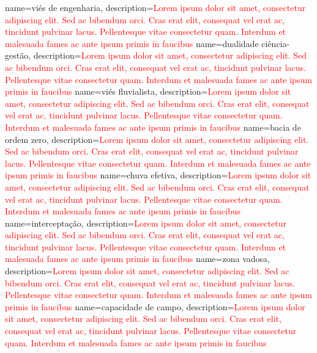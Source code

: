 {
    name=viés de engenharia,
    description={\textcolor{red}{Lorem ipsum dolor sit amet, consectetur adipiscing elit. Sed ac bibendum orci. Cras erat elit, consequat vel erat ac, tincidunt pulvinar lacus. Pellentesque vitae consectetur quam. Interdum et malesuada fames ac ante ipsum primis in faucibus}}
}
{
    name=dualidade ciência-gestão,
    description={\textcolor{red}{Lorem ipsum dolor sit amet, consectetur adipiscing elit. Sed ac bibendum orci. Cras erat elit, consequat vel erat ac, tincidunt pulvinar lacus. Pellentesque vitae consectetur quam. Interdum et malesuada fames ac ante ipsum primis in faucibus}}
}
{
    name=viés fluvialista,
    description={\textcolor{red}{Lorem ipsum dolor sit amet, consectetur adipiscing elit. Sed ac bibendum orci. Cras erat elit, consequat vel erat ac, tincidunt pulvinar lacus. Pellentesque vitae consectetur quam. Interdum et malesuada fames ac ante ipsum primis in faucibus}}
}
{
    name=bacia de ordem zero,
    description={\textcolor{red}{Lorem ipsum dolor sit amet, consectetur adipiscing elit. Sed ac bibendum orci. Cras erat elit, consequat vel erat ac, tincidunt pulvinar lacus. Pellentesque vitae consectetur quam. Interdum et malesuada fames ac ante ipsum primis in faucibus}}
}
{
    name=chuva efetiva,
    description={\textcolor{red}{Lorem ipsum dolor sit amet, consectetur adipiscing elit. Sed ac bibendum orci. Cras erat elit, consequat vel erat ac, tincidunt pulvinar lacus. Pellentesque vitae consectetur quam. Interdum et malesuada fames ac ante ipsum primis in faucibus}}
}
{
    name=interceptação,
    description={\textcolor{red}{Lorem ipsum dolor sit amet, consectetur adipiscing elit. Sed ac bibendum orci. Cras erat elit, consequat vel erat ac, tincidunt pulvinar lacus. Pellentesque vitae consectetur quam. Interdum et malesuada fames ac ante ipsum primis in faucibus}}
}
{
    name=zona vadosa,
    description={\textcolor{red}{Lorem ipsum dolor sit amet, consectetur adipiscing elit. Sed ac bibendum orci. Cras erat elit, consequat vel erat ac, tincidunt pulvinar lacus. Pellentesque vitae consectetur quam. Interdum et malesuada fames ac ante ipsum primis in faucibus}}
}
{
    name=capacidade de campo,
    description={\textcolor{red}{Lorem ipsum dolor sit amet, consectetur adipiscing elit. Sed ac bibendum orci. Cras erat elit, consequat vel erat ac, tincidunt pulvinar lacus. Pellentesque vitae consectetur quam. Interdum et malesuada fames ac ante ipsum primis in faucibus}}
}
